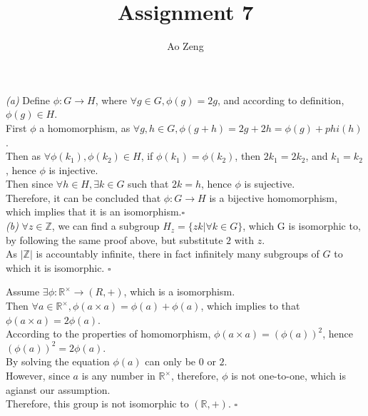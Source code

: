 \documentclass[11pt]{article}
\newenvironment{problem}[2][Problem]{\begin{trivlist}
\item[\hskip \labelsep {\bfseries #1}\hskip \labelsep {\bfseries #2.}]}{\end{trivlist}}
\begin{document}
\title{Assignment 7}
\author{Ao Zeng}
\maketitle
\begin{problem}{1}
\textit{(a)} Define $\phi : G \rightarrow H$, where $\forall g \in G, \phi (g) = 2g$, and according to definition, $\phi(g) \in H$.\\
First $\phi$ a homomorphism, as $\forall g,h \in G, \phi(g+h) = 2g + 2h = \phi(g)+phi(h)$.\\
Then as $\forall \phi(k_1), \phi(k_2) \in H$, if $\phi(k_1) = \phi(k_2)$, then $2k_1 = 2k_2$, and $k_1 = k_2$, hence $\phi$ is injective.\\
Then since $\forall h \in H, \exists k\in G$ such that $2k = h$, hence $\phi$ is sujective.\\
Therefore, it can be concluded that $\phi: G \rightarrow H$ is a bijective homomorphism, which implies that it is an isomorphism.$\square$\\
\textit{(b)} $\forall z \in \mathbb{Z}$, we can find a subgroup $H_z = \{ zk| \forall k \in G\}$, which G is isomorphic to, by following the same proof above, but substitute $2$ with $z$.\\
As $|\mathbb{Z}|$ is accountably infinite, there in fact infinitely many subgroups of $G$ to which it is isomorphic. $\square$\\
\end{problem}

\begin{problem}{2}
Assume $\exists \phi : \mathbb{R}^{\times} \rightarrow (R,+)$, which is a isomorphism.\\
Then $\forall a \in \mathbb{R}^{\times}, \phi(a \times a) = \phi(a) + \phi(a)$, which implies to that $\phi(a\times a) = 2\phi(a)$.\\
According to the properties of homomorphism, $\phi(a\times a) = (\phi(a))^2$, hence $(\phi(a))^2 = 2\phi(a)$.\\
By solving the equation $\phi(a)$ can only be $0$ or $2$.\\
However, since $a$ is any number in $\mathbb{R}^{\times}$, therefore, $\phi$ is not one-to-one, which is agianst our assumption.\\
Therefore, this group is not isomorphic to $(\mathbb{R},+)$. $\square$\\
\end{problem}
\end{document}
